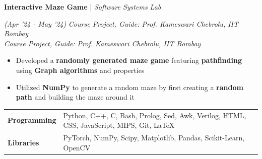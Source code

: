 \documentclass[10pt]{article}
\newcommand{\xfill}[2][1ex]{
	\dimen0=#2\advance\dimen0 by #1
	\leaders\hrule height \dimen0 depth -#1\hfill
}
\renewcommand{\section}[1]{
	\vspace{5pt}
	{\color{Blue}{\Large\scshape\raggedright #1\xfill[0pt]{0.5pt}}}
}
\renewcommand{\subsection}[4]{
	\def\temp{#4}
	\vspace{2pt}
	{
		\large
		{\color{Green} \textbf{#1}} | {\sl #2} \filldate{#3}
		\ifx\temp\empty
		\else
		{
			\\[0.098em]
			\fontsize{10.5}{13.2}\selectfont
			\sl #4
		}
		\fi
	}
}
\newcommand{\filldate}[1]{\strut\hfill {\small \textit{(#1)}}}
\begin{document}
\subsection{Interactive Maze Game}{Software Systems Lab}{Apr '24 - May '24}{\textit{Course Project, Guide: Prof. Kameswari Chebrolu, IIT Bombay}}  
\begin{itemize}
    \item Developed a \textbf{randomly generated maze game} featuring \textbf{pathfinding} using \textbf{Graph algorithms} and properties
    \item Utilized \textbf{NumPy} to generate a random maze by first creating a \textbf{random path} and building the maze around it
\end{itemize}


\vspace{-5pt}

\section{Technical Skills}

\vspace{2pt}
\begin{tabularx}{\textwidth}{ p{2.5cm}  m{14.5cm} }
	\textbf{Programming} & Python, C++, C, Bash, Prolog, Sed, Awk, Verilog, HTML, CSS, JavaScript, MIPS, Git, \LaTeX\\ 
	\textbf{Libraries} & PyTorch, NumPy, Scipy, Matplotlib, Pandas, Scikit-Learn, OpenCV\\
\end{tabularx}
\vspace{-7pt}

\section{Courses Undertaken}
\vspace{4pt}
\end{document}
